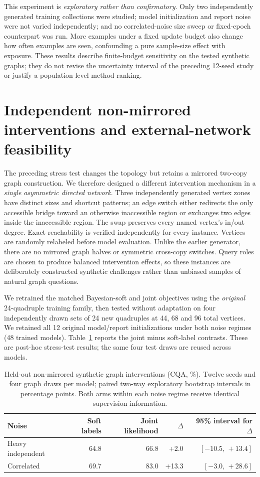 \documentclass[10pt]{article}
\begin{document}
This experiment is \emph{exploratory rather than confirmatory}. Only two independently generated training collections were studied; model initialization and report noise were not varied independently; and no correlated-noise size sweep or fixed-epoch counterpart was run. More examples under a fixed update budget also change how often examples are seen, confounding a pure sample-size effect with exposure. These results describe finite-budget sensitivity on the tested synthetic graphs; they do not revise the uncertainty interval of the preceding 12-seed study or justify a population-level method ranking.


\section{Independent non-mirrored interventions and external-network feasibility}
\label{sec:external}
The preceding stress test changes the topology but retains a mirrored two-copy graph construction. We therefore designed a different intervention mechanism in a \emph{single asymmetric directed network}. Three independently generated vertex zones have distinct sizes and shortcut patterns; an edge switch either redirects the only accessible bridge toward an otherwise inaccessible region or exchanges two edges inside the inaccessible region. The swap preserves every named vertex's in/out degree. Exact reachability is verified independently for every instance. Vertices are randomly relabeled before model evaluation. Unlike the earlier generator, there are no mirrored graph halves or symmetric cross-copy switches. Query roles are chosen to produce balanced intervention effects, so these instances are deliberately constructed synthetic challenges rather than unbiased samples of natural graph questions.

We retrained the matched Bayesian-soft and joint objectives using the \emph{original} 24-quadruple training family, then tested without adaptation on four independently drawn sets of 24 new quadruples at 44, 68 and 96 total vertices. We retained all 12 original model/report initializations under both noise regimes (48 trained models). Table~\ref{tab:nonmirror} reports the joint minus soft-label contrasts. These are post-hoc stress-test results; the same four test draws are reused across models.

\begin{table}[h]
\centering\small
\caption{Held-out non-mirrored synthetic graph interventions (CQA, \%). Twelve seeds and four graph draws per model; paired two-way exploratory bootstrap intervals in percentage points. Both arms within each noise regime receive identical supervision information.}
\label{tab:nonmirror}
\begin{tabular}{lrrrr}
\toprule
Noise & Soft labels & Joint likelihood & $\Delta$ & 95\% interval for $\Delta$\\
\midrule
Heavy independent & 64.8 & 66.8 & +2.0 & $[-10.5,\,+13.4]$\\
Correlated & 69.7 & 83.0 & +13.3 & $[-3.0,\,+28.6]$\\
\bottomrule
\end{tabular}
\end{table}
\end{document}

